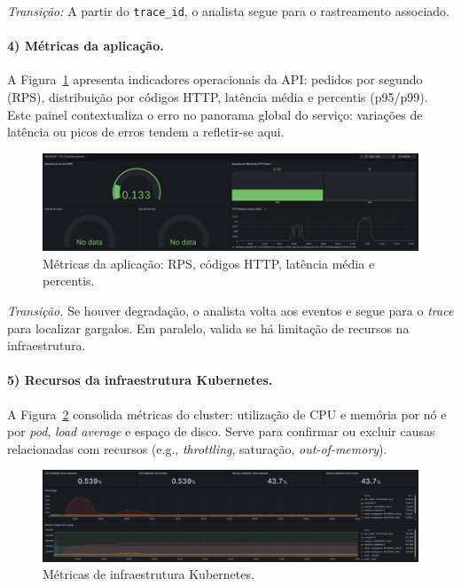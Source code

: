 \textit{Transição:} A partir do \texttt{trace\_id}, o analista segue para o rastreamento associado.

\paragraph{4) Métricas da aplicação.}

A Figura~\ref{fig:dash-4} apresenta indicadores operacionais da API: pedidos por segundo (RPS), distribuição por códigos HTTP, latência média e percentis (p95/p99). Este painel contextualiza o erro no panorama global do serviço: variações de latência ou picos de erros tendem a refletir-se aqui.

\begin{figure}[H]
    \centering
    \includegraphics[width=\textwidth]{images/Grafana/metrics_dashboard.png}
    \caption{Métricas da aplicação: RPS, códigos HTTP, latência média e percentis.}
    \label{fig:dash-4}
\end{figure}

\textit{Transição.} Se houver degradação, o analista volta aos eventos e segue para o \textit{trace} para localizar gargalos. Em paralelo, valida se há limitação de recursos na infraestrutura.

\paragraph{5) Recursos da infraestrutura Kubernetes.}

A Figura~\ref{fig:dash-5} consolida métricas do cluster: utilização de CPU e memória por nó e por \textit{pod}, \textit{load average} e espaço de disco. Serve para confirmar ou excluir causas relacionadas com recursos (e.g., \textit{throttling}, saturação, \textit{out-of-memory}).

\begin{figure}[H]
    \centering
    \includegraphics[width=\textwidth]{images/Grafana/cpu_memory_dashboard.png}
    \caption{Métricas de infraestrutura Kubernetes.}
    \label{fig:dash-5}
\end{figure}

